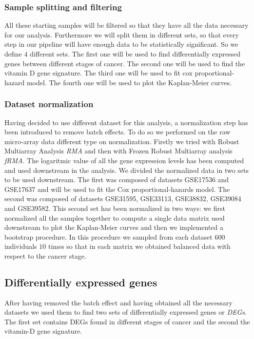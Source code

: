 \documentclass[fleqn,10pt]{SelfArx} %
\begin{document}
		\subsubsection{Sample splitting and filtering}
			All these starting samples will be filtered so that they have all the data necessary for our analysis.
			Furthermore we will split them in different sets, so that every step in our pipeline will have enough data to be statistically significant.
			So we define $4$ different sets.
			The first one will be used to find differentially expressed genes between different stages of cancer.
			The second one will be used to find the vitamin D gene signature.
			The third one will be used to fit cox proportional-hazard model.
			The fourth one will be used to plot the Kaplan-Meier curves.

		\subsubsection{Dataset normalization}
			Having decided to use different dataset for this analysis, a normalization step has been introduced to remove batch effects.
			To do so we performed on the raw micro-array data different type on normalization.
			Firstly we tried with Robust Multiarray Analysis \emph{RMA} and then with Frozen Robust Multiarray analysis \emph{fRMA}.
			The logaritmic value of all the gene expression levels has been computed and used downstream in the analysis.
			We divided the normalized data in two sets to be used downstream.
			The first was composed of datasets  GSE17536 and GSE17637 and will be used to fit the Cox proportional-hazards model.
			The second was composed of datasets GSE31595, GSE33113, GSE38832, GSE39084 and GSE39582.
			This second set has been normalized in two ways: we first normalized all the samples together to compute a single data matrix used downstream to plot the Kaplan-Meier curves and then we implemented a bootstrap procedure.
			In this procedure we sampled from each dataset $600$ individuals $10$ times so that in each matrix we obtained balanced data with respect to the cancer stage.

	\subsection{Differentially expressed genes}
		After having removed the batch effect and having obtained all the necessary datasets we used them to find two sets of differentially expressed genes or \emph{DEGs}.
		The first set contains DEGs found in different stages of cancer and the second the vitamin-D gene signature.
\end{document}
